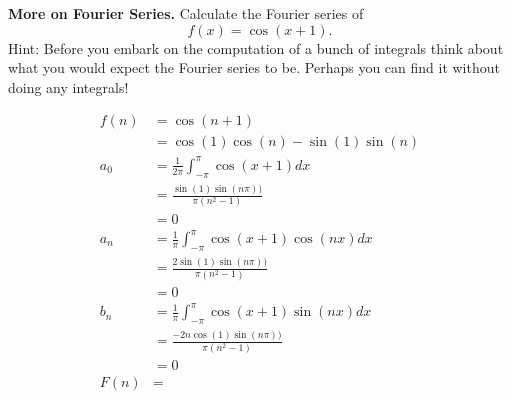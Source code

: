 \textbf{More on Fourier Series.} Calculate the Fourier series
of \[f(x) = \cos(x + 1).\] Hint: Before you embark on the computation
of a bunch of integrals think about what you would expect the Fourier
series to be. Perhaps you can find it without doing any integrals!

{\color{blue}

\[
\begin{aligned}
f(n) &= \cos(n+1) \\
     &= \cos(1) \cos(n) - \sin(1) \sin(n) \\
a_{0} &=\frac{1}{2\pi}\int_{-\pi}^{\pi}\cos(x+1)dx\\
	&=\frac{\sin(1)\sin(n\pi))}{\pi(n^2-1)}\\
	&=0\\
a_{n} &=\frac{1}{\pi}\int_{-\pi}^{\pi}\cos(x+1)\cos(nx)dx\\
	&=\frac{2\sin(1)\sin(n\pi))}{\pi(n^2-1)}\\
	&=0\\
b_{n} &=\frac{1}{\pi}\int_{-\pi}^{\pi}\cos(x+1)\sin(nx)dx\\
	&=\frac{-2n\cos(1)\sin(n\pi))}{\pi(n^2-1)}\\
	&=0\\
F(n) &=
\end{aligned}
\]

}
